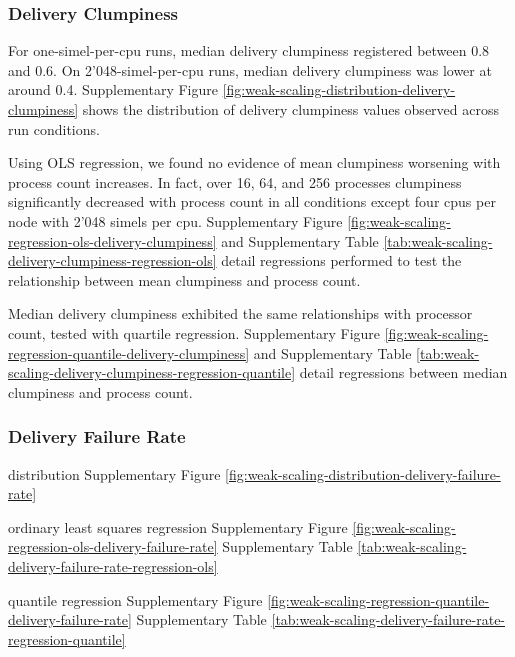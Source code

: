 \subsubsection{Delivery Clumpiness}

For one-simel-per-cpu runs, median delivery clumpiness registered between 0.8 and 0.6.
On 2'048-simel-per-cpu runs, median delivery clumpiness was lower at around 0.4.
Supplementary Figure \ref{fig:weak-scaling-distribution-delivery-clumpiness}
shows the distribution of delivery clumpiness values observed across run conditions.

Using OLS regression, we found no evidence of mean clumpiness worsening with process count increases.
In fact, over 16, 64, and 256 processes clumpiness significantly decreased with process count in all conditions except four cpus per node with 2'048 simels per cpu.
Supplementary Figure \ref{fig:weak-scaling-regression-ols-delivery-clumpiness} and Supplementary Table \ref{tab:weak-scaling-delivery-clumpiness-regression-ols} detail regressions performed to test the relationship between mean clumpiness and process count.

Median delivery clumpiness exhibited the same relationships with processor count, tested with quartile regression.
Supplementary Figure \ref{fig:weak-scaling-regression-quantile-delivery-clumpiness} and Supplementary Table \ref{tab:weak-scaling-delivery-clumpiness-regression-quantile} detail regressions between median clumpiness and process count.

\subsubsection{Delivery Failure Rate}

distribution Supplementary Figure \ref{fig:weak-scaling-distribution-delivery-failure-rate}

ordinary least squares regression Supplementary Figure \ref{fig:weak-scaling-regression-ols-delivery-failure-rate} Supplementary Table \ref{tab:weak-scaling-delivery-failure-rate-regression-ols}

quantile regression Supplementary Figure \ref{fig:weak-scaling-regression-quantile-delivery-failure-rate}
Supplementary Table \ref{tab:weak-scaling-delivery-failure-rate-regression-quantile}
